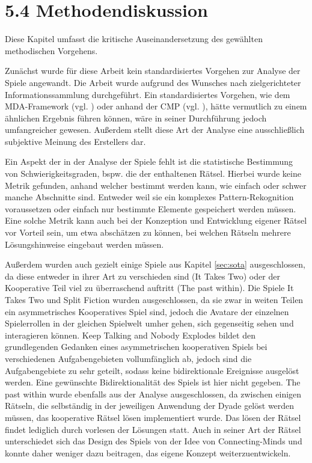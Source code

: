 \section{5.4 Methodendiskussion}\label{sec:analysis-discussion}
Diese Kapitel umfasst die kritische Auseinandersetzung des gewählten methodischen Vorgehens.

Zunächst wurde für diese Arbeit kein standardisiertes Vorgehen zur Analyse der Spiele angewandt. Die Arbeit wurde aufgrund des Wunsches nach zielgerichteter Informationssammlung durchgeführt. Ein standardisiertes Vorgehen, wie dem \ac{MDA}-Framework (vgl. \cite{hunicke_mda_2004}) oder anhand der \ac{CMP} (vgl. \cite{seif_el-nasr_understanding_2010}), hätte vermutlich zu einem ähnlichen Ergebnis führen können, wäre in seiner Durchführung jedoch umfangreicher gewesen.
Außerdem stellt diese Art der Analyse eine ausschließlich subjektive Meinung des Erstellers dar.

Ein Aspekt der in der Analyse der Spiele fehlt ist die statistische Bestimmung von Schwierigkeitsgraden, bspw. die der enthaltenen Rätsel. Hierbei wurde keine Metrik gefunden, anhand welcher bestimmt werden kann, wie einfach oder schwer manche Abschnitte sind. Entweder weil sie ein komplexes Pattern-Rekognition voraussetzen oder einfach nur bestimmte Elemente gespeichert werden müssen. Eine solche Metrik kann auch bei der Konzeption und Entwicklung eigener Rätsel vor Vorteil sein, um etwa abschätzen zu können, bei welchen Rätseln mehrere Lösungshinweise eingebaut werden müssen.

Außerdem wurden auch gezielt einige Spiele aus Kapitel \ref{sec:sota} ausgeschlossen, da diese entweder in ihrer Art zu verschieden sind (It Takes Two) oder der Kooperative Teil viel zu überraschend auftritt (The past within). Die Spiele It Takes Two und Split Fiction wurden ausgeschlossen, da sie zwar in weiten Teilen ein asymmetrisches Kooperatives Spiel sind, jedoch die Avatare der einzelnen Spielerrollen in der gleichen Spielwelt umher gehen, sich gegenseitig sehen und interagieren können. Keep Talking and Nobody Explodes bildet den grundlegenden Gedanken eines asymmetrischen kooperativen Spiels bei verschiedenen Aufgabengebieten vollumfänglich ab, jedoch sind die Aufgabengebiete zu sehr geteilt, sodass keine bidirektionale Ereignisse ausgelöst werden. Eine gewünschte Bidirektionalität des Spiels ist hier nicht gegeben. The past within wurde ebenfalls aus der Analyse ausgeschlossen, da zwischen einigen Rätseln, die selbständig in der jeweiligen Anwendung der Dyade gelöst werden müssen, das kooperative Rätsel lösen implementiert wurde. Das lösen der Rätsel findet lediglich durch vorlesen der Lösungen statt.  Auch in seiner Art der Rätsel unterschiedet sich das Design des Spiels von der Idee von Connecting-Minds und konnte daher weniger dazu beitragen, das eigene Konzept weiterzuentwickeln.

